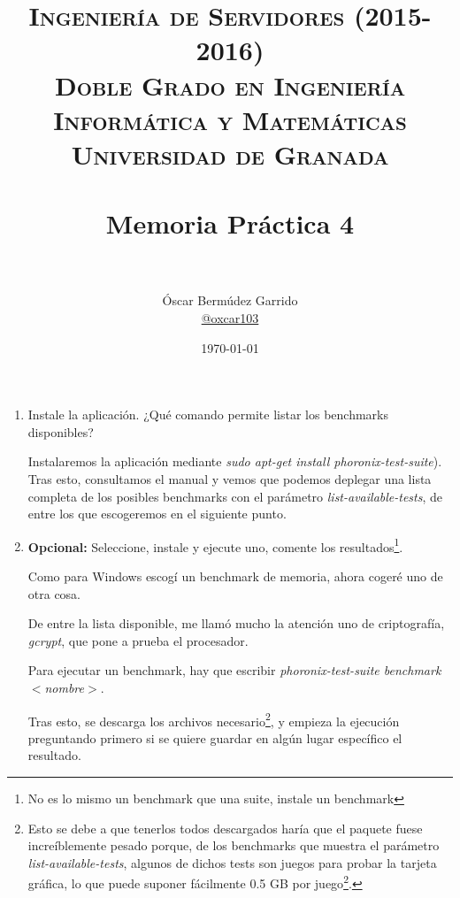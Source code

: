\documentclass[paper=a4, fontsize=11pt]{scrartcl} %
\title{	
\normalfont \normalsize 
\textsc{{\bf Ingeniería de Servidores (2015-2016)} \\ Doble Grado en Ingeniería Informática y Matemáticas \\ Universidad de Granada} \\ [25pt] %
\horrule{0.5pt} \\[0.4cm] %
\huge Memoria Práctica 4 \\ %
\horrule{2pt} \\[0.5cm] %
}
\author{Óscar Bermúdez Garrido\\ \href{http://www.github.com/oxcar103}{@oxcar103}} %
\date{\normalsize\today} %
\numberwithin{equation}{section} %
\numberwithin{figure}{section} %
\numberwithin{table}{section} %
\begin{document}
\maketitle %
\newpage %
\tableofcontents %
\listoffigures

\newpage

\begin{enumerate}
	\section{Benchmarks populares}
	\subsection{Phoronix Suite}
		\item Instale la aplicación. ¿Qué comando permite listar los benchmarks disponibles?
		
		Instalaremos la aplicación mediante \textit{sudo apt-get install phoronix-test-suite}). Tras
		esto, consultamos el manual \cite{man_phoronix} y vemos que podemos deplegar una lista completa
		de los posibles benchmarks con el parámetro \textit{list-available-tests}, de entre los que
		escogeremos en el siguiente punto.
		
		\item \textbf{Opcional:} Seleccione, instale y ejecute uno, comente los resultados\footnote{No
		es lo mismo un benchmark que una suite, instale un benchmark}.
		
		Como para Windows escogí un benchmark de memoria, ahora cogeré uno de otra cosa.
		
		De entre la lista disponible, me llamó mucho la atención uno de criptografía, \textit{gcrypt},
		que pone a prueba el procesador.
		
		Para ejecutar un benchmark, hay que escribir \textit{phoronix-test-suite benchmark $<$nombre$>$}.
		
		Tras esto, se descarga los archivos necesario\footnote{Esto se debe a que tenerlos todos
		descargados haría que el paquete fuese increíblemente pesado porque, de los benchmarks que
		muestra el parámetro \textit{list-available-tests}, algunos de dichos tests son juegos para
		probar la tarjeta gráfica, lo que puede suponer fácilmente 0.5 GB por juego\footnote{Nótese
		además que hay otro comando disponible llamado \textit{list-available-suites} que permite ver
		algunos bancos de pruebas, con lo cuál, el peso sería aún mayor.}.}, y empieza la ejecución
		preguntando primero si se quiere guardar en algún lugar específico el resultado.
		

\end{enumerate}
\end{document}
